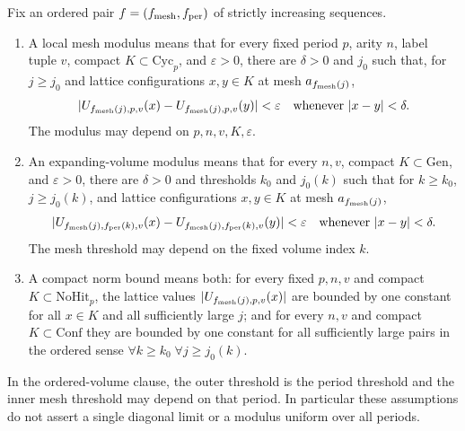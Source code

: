 \begin{definition}
\label{def:ex-limits-estimates}
Fix an ordered pair $f=(f_{\rm mesh},f_{\rm per})$ of strictly increasing
sequences.

\begin{enumerate}
\item A local mesh modulus means that for every fixed period $p$, arity $n$,
  label tuple $v$, compact $K\subset\mathrm{Cyc}_p$, and $\varepsilon>0$,
  there are $\delta>0$ and $j_0$ such that, for $j\ge j_0$ and lattice
  configurations $x,y\in K$ at mesh $a_{f_{\rm mesh}(j)}$,
  \[
  |U_{f_{\rm mesh}(j),p,v}(x)-U_{f_{\rm mesh}(j),p,v}(y)|<\varepsilon
  \quad\hbox{whenever }|x-y|<\delta.
  \]
  The modulus may depend on $p,n,v,K,\varepsilon$.
\item An expanding-volume modulus means that for every $n,v$, compact
  $K\subset\mathrm{Gen}$, and $\varepsilon>0$, there are $\delta>0$ and
  thresholds $k_0$ and $j_0(k)$ such that for $k\ge k_0$, $j\ge j_0(k)$,
  and lattice configurations $x,y\in K$ at mesh $a_{f_{\rm mesh}(j)}$,
  \[
  |U_{f_{\rm mesh}(j),f_{\rm per}(k),v}(x)
       -U_{f_{\rm mesh}(j),f_{\rm per}(k),v}(y)|<\varepsilon
       \quad\hbox{whenever }|x-y|<\delta.
  \]
  The mesh threshold may depend on the fixed volume index $k$.
\item A compact norm bound means both: for every fixed $p,n,v$ and compact
  $K\subset\mathrm{NoHit}_p$, the lattice values $|U_{f_{\rm mesh}(j),p,v}(x)|$
  are bounded by one constant for all $x\in K$ and all sufficiently large
  $j$; and for every $n,v$ and compact $K\subset\mathrm{Conf}$ they are
  bounded by one constant for all sufficiently large pairs in the ordered
  sense $\forall k\ge k_0\;\forall j\ge j_0(k)$.
\end{enumerate}

In the ordered-volume clause, the outer threshold is the period threshold and
the inner mesh threshold may depend on that period. In particular these
assumptions do not assert a single diagonal limit or a modulus uniform over
all periods.
\end{definition}

